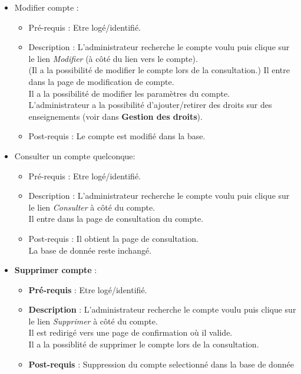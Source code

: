 \begin{itemize}
\begin{itemize}
		\item Modifier compte :
			\begin{itemize}
			\item Pr{\'e}-requis : Etre log{\'e}/identifi{\'e}. 
			\item Description : L'administrateur recherche
			le compte voulu puis clique sur le lien {\it
			Modifier} ({\`a} c{\^o}t{\'e} du lien vers le compte).\\
			(Il a la possibilit{\'e} de modifier le compte lors
			de la consultation.)
			Il entre dans la page de modification de compte.\\
			Il a la possibilit{\'e} de modifier les param{\`e}tres
			du compte.\\
			L'administrateur a la possibilit{\'e}
			d'ajouter/retirer des droits sur des
			enseignements (voir dans {\bf Gestion des droits}).
			\item Post-requis : Le compte est modifi{\'e} dans la base. 
			\end{itemize}

		\item Consulter un compte quelconque:
			\begin{itemize}
			\item Pr{\'e}-requis : Etre log{\'e}/identifi{\'e}. 
			\item Description : L'administrateur recherche
			le compte voulu puis clique sur le lien {\it
			Consulter} {\`a} c{\^o}t{\'e} du compte.\\
			Il entre dans la page de consultation du compte.
			\item Post-requis : Il obtient la page de consultation.\\
			La base de donn{\'e}e reste inchang{\'e}.
			\end{itemize}

		\item {\bf Supprimer compte} :
			\begin{itemize}
			\item {\bf Pr{\'e}-requis} : Etre log{\'e}/identifi{\'e}.
			\item {\bf Description} : L'administrateur recherche
			le compte voulu puis clique sur le lien {\it
			Supprimer} {\`a} c{\^o}t{\'e} du compte.\\
			Il est redirig{\'e} vers une page de
			confirmation o{\`u} il valide.\\ Il a la
			possiblit{\'e} de supprimer le compte lors de la consultation.
			\item {\bf Post-requis} : Suppression du compte
			selectionn{\'e} dans la base de donn{\'e}e\\
			\end{itemize}
		\end{itemize}
	\end{itemize}
